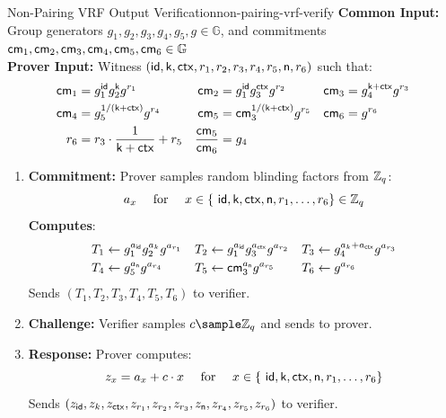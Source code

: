 \begin{protocol}{Non-Pairing VRF Output Verification}{non-pairing-vrf-verify}\label{pok-non-pairing-vrf}
\textbf{Common Input:} Group generators $g_1, g_2, g_3, g_4, g_5, g \in \mathbb{G}$, and commitments $\mathsf{cm}_1, \mathsf{cm}_2, \mathsf{cm}_3, \mathsf{cm}_4, \mathsf{cm}_5, \mathsf{cm}_6 \in \mathbb{G}$\\
\textbf{Prover Input:} Witness $(\mathsf{id}, \mathsf{k}, \mathsf{ctx}, r_1, r_2, r_3, r_4, r_5, \textsf{n}, r_6)$ such that:
    \begin{align*}
        \mathsf{cm}_1 &= g_1^{\mathsf{id}} g_2^{\mathsf{k}} g^{r_1}     &    \mathsf{cm}_2 &= g_1^{\mathsf{id}} g_3^{\mathsf{ctx}} g^{r_2}  &   \mathsf{cm}_3 &= g_4^{\mathsf{k} + \mathsf{ctx}} g^{r_3}\\
        \mathsf{cm}_4 &= g_5^{1/(\mathsf{k} + \mathsf{ctx})} g^{r_4}   &   \mathsf{cm}_5 &= \mathsf{cm}_3^{1/(\mathsf{k} + \mathsf{ctx})} g^{r_5}     &   \mathsf{cm}_6 &= g^{r_6} \\
       r_6 &= r_3 \cdot \frac{1}{\mathsf{k} + \mathsf{ctx}} + r_5    &   \frac{\mathsf{cm}_5}{\mathsf{cm}_6} &= g_4
    \end{align*}

\begin{enumerate}
    \item \textbf{Commitment:} Prover samples random blinding factors from $\mathbb{Z}_q$:
    \[
        a_x \quad \text{ for } \quad x \in \{\ \mathsf{id}, \mathsf{k}, \mathsf{ctx}, \textsf{n}, r_1, \ldots,r_6\} \in \mathbb{Z}_q
    \]
    \textbf{Computes}:
    \begin{align*}
        T_1 &\gets g_1^{a_{\mathsf{id}}} g_2^{a_k} g^{a_{r_1}}  &   T_2 &\gets g_1^{a_{\mathsf{id}}} g_3^{a_{\mathsf{ctx}}} g^{a_{r_2}}     &   T_3 &\gets g_4^{a_k + a_{\mathsf{ctx}}} g^{a_{r_3}} \\
        T_4 &\gets g_5^{a_{\textsf{n}}} g^{a_{r_4}}   &   T_5 &\gets \mathsf{cm}_3^{a_{\textsf{n}}} g^{a_{r_5}}     &   T_6 &\gets g^{a_{r_6}}
    \end{align*}
    Sends $(T_1, T_2, T_3, T_4, T_5, T_6)$ to verifier.
    
    \item \textbf{Challenge:} Verifier samples $c \sample \mathbb{Z}_q$ and sends to prover.
    
    \item \textbf{Response:} Prover computes:
    \[
    z_x = a_x + c \cdot x \quad \text{ for } \quad x \in \{\ \mathsf{id}, \mathsf{k}, \mathsf{ctx}, \textsf{n}, r_1, \ldots,r_6\} 
    \]
    Sends $(z_{\mathsf{id}}, z_k, z_{\mathsf{ctx}}, z_{r_1}, z_{r_2}, z_{r_3}, z_{\textsf{n}}, z_{r_4}, z_{r_5}, z_{r_6})$ to verifier.
    

\end{enumerate}
\end{protocol}
